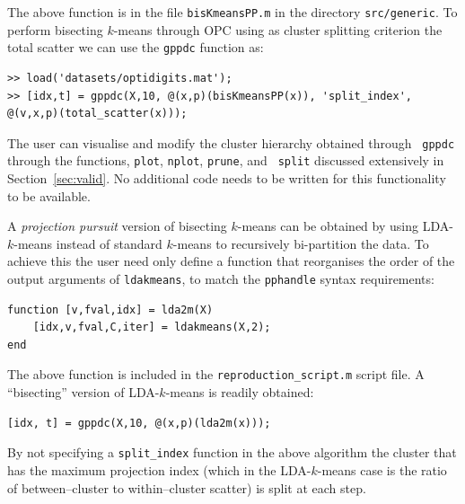 \documentclass{book}
\begin{document}
\noindent
%
The above function is in the file {\tt bisKmeansPP.m} in the directory {\tt src/generic}.
To perform bisecting $k$-means through OPC using as cluster splitting criterion 
the total scatter we can use the {\tt gppdc} function as:

\begin{verbatim}
>> load('datasets/optidigits.mat');
>> [idx,t] = gppdc(X,10, @(x,p)(bisKmeansPP(x)), 'split_index', @(v,x,p)(total_scatter(x)));
\end{verbatim}

\noindent
%
The user can visualise and modify the cluster hierarchy obtained through {\tt
gppdc} through the functions, {\tt plot}, {\tt nplot}, {\tt prune}, and {\tt
split} discussed extensively in Section~\ref{sec:valid}. No additional code
needs to be written for this functionality to be available.



A {\em projection pursuit} version of bisecting $k$-means
can be obtained by using LDA-$k$-means instead of standard $k$-means to recursively bi-partition
the data.
To achieve this the user need only define a function that reorganises the order of the output
arguments of {\tt ldakmeans}, to match the {\tt pphandle} syntax requirements:

\begin{verbatim}
function [v,fval,idx] = lda2m(X)
	[idx,v,fval,C,iter] = ldakmeans(X,2);
end
\end{verbatim}

\noindent
%
The above function is included in the {\tt reproduction\_script.m} script file.
A ``bisecting'' version of LDA-$k$-means is readily obtained:

\begin{verbatim}
[idx, t] = gppdc(X,10, @(x,p)(lda2m(x)));
\end{verbatim}


\noindent
%
By not specifying a {\tt split\_index} function in the above algorithm the
cluster that has the maximum projection index (which in the LDA-$k$-means case
is the ratio of between--cluster to within--cluster scatter) is split at each step.




\end{document}
